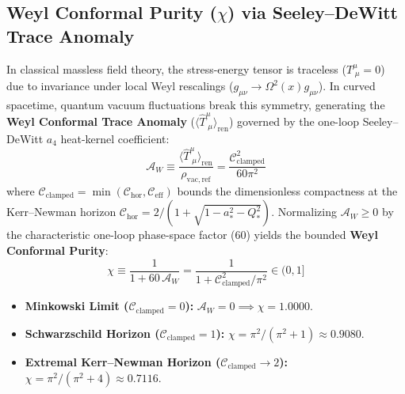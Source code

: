 \documentclass[11pt,a4paper]{article}
\begin{document}
\subsection{Weyl Conformal Purity ($\chi$) via Seeley--DeWitt Trace Anomaly}
In classical massless field theory, the stress-energy tensor is traceless ($T^\mu_{\;\mu} = 0$) due to invariance under local Weyl rescalings ($g_{\mu\nu} \to \Omega^2(x) g_{\mu\nu}$). In curved spacetime, quantum vacuum fluctuations break this symmetry, generating the \textbf{Weyl Conformal Trace Anomaly} ($\langle \hat{T}^\mu_{\;\mu} \rangle_{\mathrm{ren}}$) governed by the one-loop Seeley--DeWitt $a_4$ heat-kernel coefficient:
\begin{equation}
\mathcal{A}_W \equiv \frac{\langle \hat{T}^\mu_{\;\mu} \rangle_{\mathrm{ren}}}{\rho_{\mathrm{vac,ref}}} = \frac{\mathcal{C}_{\mathrm{clamped}}^2}{60\pi^2}
\end{equation}
where $\mathcal{C}_{\mathrm{clamped}} = \min(\mathcal{C}_{\mathrm{hor}}, \mathcal{C}_{\mathrm{eff}})$ bounds the dimensionless compactness at the Kerr--Newman horizon $\mathcal{C}_{\mathrm{hor}} = 2 / (1 + \sqrt{1 - a_*^2 - Q_*^2})$. Normalizing $\mathcal{A}_W \ge 0$ by the characteristic one-loop phase-space factor ($60$) yields the bounded \textbf{Weyl Conformal Purity}:
\begin{equation}
\chi \equiv \frac{1}{1 + 60\,\mathcal{A}_W} = \frac{1}{1 + \mathcal{C}_{\mathrm{clamped}}^2 / \pi^2} \in (0, 1]
\end{equation}
\begin{itemize}
    \item \textbf{Minkowski Limit ($\mathcal{C}_{\mathrm{clamped}} = 0$):} $\mathcal{A}_W = 0 \implies \chi = 1.0000$.
    \item \textbf{Schwarzschild Horizon ($\mathcal{C}_{\mathrm{clamped}} = 1$):} $\chi = \pi^2 / (\pi^2 + 1) \approx 0.9080$.
    \item \textbf{Extremal Kerr--Newman Horizon ($\mathcal{C}_{\mathrm{clamped}} \to 2$):} $\chi = \pi^2 / (\pi^2 + 4) \approx 0.7116$.
\end{itemize}
\end{document}
